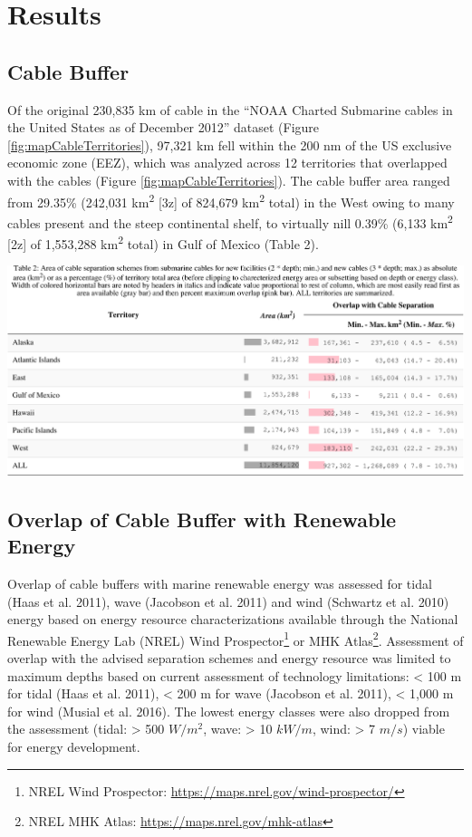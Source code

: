 \documentclass[]{article}
\let\rmarkdownfootnote\footnote%
\def\footnote{\protect\rmarkdownfootnote}
\begin{document}
\hypertarget{results}{%
\section{Results}\label{results}}

\hypertarget{cable-buffer}{%
\subsection{Cable Buffer}\label{cable-buffer}}

Of the original 230,835 km of cable in the ``NOAA Charted Submarine
cables in the United States as of December 2012'' dataset (Figure
\ref{fig:mapCableTerritories}), 97,321 km fell within the 200 nm of the
US exclusive economic zone (EEZ), which was analyzed across 12
territories that overlapped with the cables (Figure
\ref{fig:mapCableTerritories}). The cable buffer area ranged from
29.35\% (242,031 km\textsuperscript{2} {[}3z{]} of 824,679
km\textsuperscript{2} total) in the West owing to many cables present
and the steep continental shelf, to virtually nill 0.39\% (6,133
km\textsuperscript{2} {[}2z{]} of 1,553,288 km\textsuperscript{2} total)
in Gulf of Mexico (Table 2).

\includegraphics{report_files/figure-latex/tbl02CableBufferTerritories-1.pdf}

\hypertarget{overlap-of-cable-buffer-with-renewable-energy}{%
\subsection{Overlap of Cable Buffer with Renewable
Energy}\label{overlap-of-cable-buffer-with-renewable-energy}}

Overlap of cable buffers with marine renewable energy was assessed for
tidal (Haas et al. 2011), wave (Jacobson et al. 2011) and wind (Schwartz
et al. 2010) energy based on energy resource characterizations available
through the National Renewable Energy Lab (NREL) Wind
Prospector\footnote{NREL Wind Prospector:
  \url{https://maps.nrel.gov/wind-prospector/}} or MHK Atlas\footnote{NREL
  MHK Atlas: \url{https://maps.nrel.gov/mhk-atlas}}. Assessment of
overlap with the advised separation schemes and energy resource was
limited to maximum depths based on current assessment of technology
limitations: \textless{} 100 m for tidal (Haas et al. 2011), \textless{}
200 m for wave (Jacobson et al. 2011), \textless{} 1,000 m for wind
(Musial et al. 2016). The lowest energy classes were also dropped from
the assessment (tidal: \textgreater{} 500 \(W/m^2\), wave:
\textgreater{} 10 \(kW/m\), wind: \textgreater{} 7 \(m/s\)) viable for
energy development.
\end{document}
